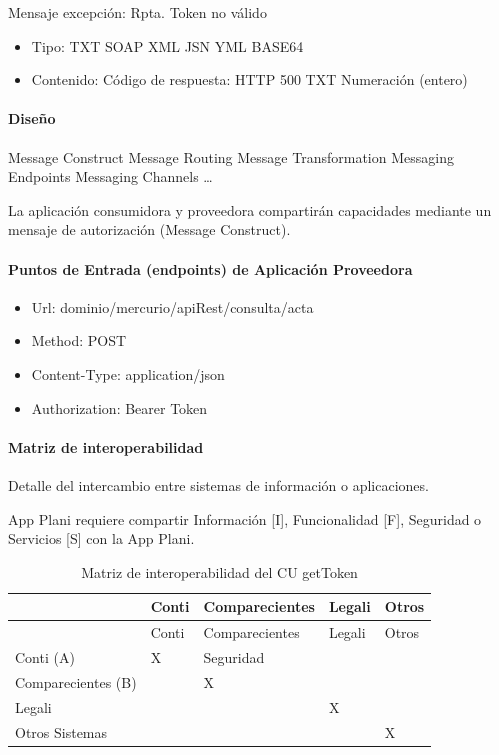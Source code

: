 \documentclass[
  paper=a4,
  ,captions=tableheading
]{scrartcl}
\providecommand{\tightlist}{%
  \setlength{\itemsep}{0pt}\setlength{\parskip}{0pt}}
\begin{document}
Mensaje excepción: Rpta. Token no válido

\begin{itemize}
\tightlist
\item
  Tipo: TXT \textbar{} SOAP \textbar{} XML \textbar{} JSN \textbar{} YML
  \textbar{} BASE64
\item
  Contenido: Código de respuesta: HTTP 500 \textbar{} TXT \textbar{}
  Numeración (entero)
\end{itemize}

\paragraph{Diseño}\label{sec:diseuxf1o-2}

Message Construct \textbar{} Message Routing \textbar{} Message
Transformation \textbar{} Messaging Endpoints \textbar{} Messaging
Channels \textbar{} \ldots{}

La aplicación consumidora y proveedora compartirán capacidades mediante
un mensaje de autorización (Message Construct).

\paragraph{Puntos de Entrada (endpoints) de Aplicación
Proveedora}\label{sec:puntos-de-entrada-endpoints-de-aplicaciuxf3n-proveedora}

\begin{itemize}
\tightlist
\item
  Url: dominio/mercurio/apiRest/consulta/acta
\item
  Method: POST
\item
  Content-Type: application/json
\item
  Authorization: Bearer Token
\end{itemize}

\paragraph{Matriz de
interoperabilidad}\label{sec:matriz-de-interoperabilidad-2}

Detalle del intercambio entre sistemas de información o aplicaciones.

App Plani requiere compartir Información {[}I{]}, Funcionalidad {[}F{]},
Seguridad o Servicios {[}S{]} con la App Plani.

\begin{longtable}[]{@{}lllll@{}}
\caption{Matriz de interoperabilidad del CU getToken}\tabularnewline
\toprule\noalign{}
& Conti & Comparecientes & Legali & Otros \\
\midrule\noalign{}
\endfirsthead
\toprule\noalign{}
& Conti & Comparecientes & Legali & Otros \\
\midrule\noalign{}
\endhead
\bottomrule\noalign{}
\endlastfoot
Conti (A) & X & Seguridad & & \\
Comparecientes (B) & & X & & \\
Legali & & & X & \\
Otros Sistemas & & & & X \\
\end{longtable}
\end{document}
